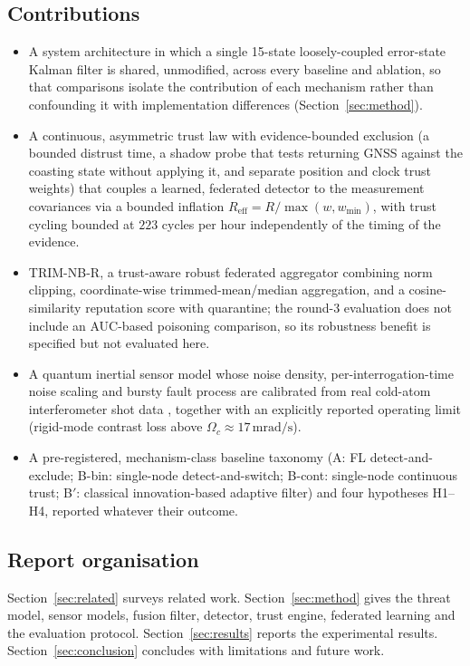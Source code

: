 \documentclass[12pt,a4paper]{article}
\begin{document}
\subsection{Contributions}
\begin{itemize}
\item A system architecture in which a single 15-state loosely-coupled error-state Kalman filter is shared, unmodified, across every baseline and ablation, so that comparisons isolate the contribution of each mechanism rather than confounding it with implementation differences (Section~\ref{sec:method}).
\item A continuous, asymmetric trust law with evidence-bounded exclusion (a bounded distrust time, a shadow probe that tests returning GNSS against the coasting state without applying it, and separate position and clock trust weights) that couples a learned, federated detector to the measurement covariances via a bounded inflation $R_{\mathrm{eff}} = R / \max(w, w_{\min})$, with trust cycling bounded at $223$ cycles per hour independently of the timing of the evidence.
\item TRIM-NB-R, a trust-aware robust federated aggregator combining norm clipping, coordinate-wise trimmed-mean/median aggregation, and a cosine-similarity reputation score with quarantine; the round-3 evaluation does not include an AUC-based poisoning comparison, so its robustness benefit is specified but not evaluated here.
\item A quantum inertial sensor model whose noise density, per-interrogation-time noise scaling and bursty fault process are calibrated from real cold-atom interferometer shot data \cite{darmagnac2024atom}, together with an explicitly reported operating limit (rigid-mode contrast loss above $\Omega_c \approx 17\,\mathrm{mrad/s}$).
\item A pre-registered, mechanism-class baseline taxonomy (A: FL detect-and-exclude; B-bin: single-node detect-and-switch; B-cont: single-node continuous trust; B$'$: classical innovation-based adaptive filter) and four hypotheses H1--H4, reported whatever their outcome.
\end{itemize}

\subsection{Report organisation}
Section~\ref{sec:related} surveys related work. Section~\ref{sec:method} gives the threat model, sensor models, fusion filter, detector, trust engine, federated learning and the evaluation protocol. Section~\ref{sec:results} reports the experimental results. Section~\ref{sec:conclusion} concludes with limitations and future work.
\end{document}
